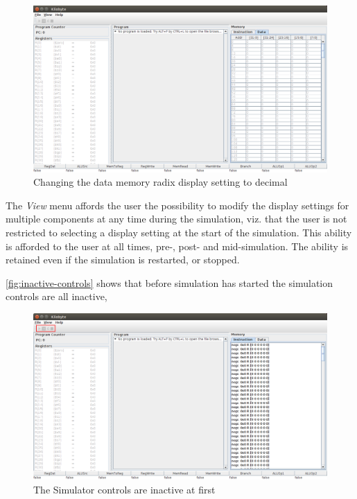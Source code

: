 \begin{figure}[H]
  \centering
  \includegraphics[width=\textwidth]{images/radix_display_result.png} 
  \caption{Changing the data memory radix display setting to decimal} 
  \label{fig:change-radix-1-result}
\end{figure}

The \emph{View} menu affords the user the possibility to modify the
display settings for multiple components at any time during the
simulation, viz. that the user is not restricted to selecting a
display setting at the start of the simulation. This ability is
afforded to the user at all times, pre-, post- and mid-simulation.
The ability is retained even if the simulation is restarted, or
stopped.

\autoref{fig:inactive-controls} shows that before simulation has
started the simulation controls are all inactive,

\begin{figure}[H]
  \centering
  \includegraphics[width=\textwidth]{images/initial_gui_controls.png} 
  \caption{The Simulator controls are inactive at first} 
  \label{fig:inactive-controls}
\end{figure}

